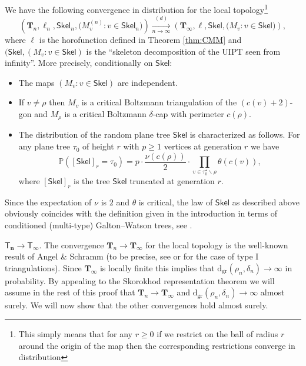\documentclass[AHL,XML,longabstracts,Unicode,NoSaveZebib]{cedram}
\begin{document}
\begin{theorem} \label{thm:skeletoninfinity} We have the following convergence in distribution for the local topology\footnote{This simply means that for any $r\geq 0$ if we restrict on the ball of radius $r$ around the origin of the map then the corresponding restrictions converge in distribution}
$$ \left( \mathbf{T}_{n}, \ell_{n}, \mathsf{Skel}_{n} , \big( M_{v}^{(n)} : v \in \mathsf{Skel}_{n} \big)\right) \xrightarrow[n\to\infty]{(d)} \left( \mathbf{T}_{\infty}, \ell, \mathsf{Skel}, \big( M_{v} : v \in \mathsf{Skel} \big)\right),$$
where $\ell$ is the horofunction defined in Theorem \ref{thm:CMM} and $(\mathsf{Skel}, ( M_{v} : v \in \mathsf{Skel} )$ is the ``skeleton decomposition of the UIPT seen from infinity''. More precisely, conditionally on $ \mathsf{Skel}$:
\begin{itemize}
\item The maps $(M_{v} : v \in \mathsf{Skel})$ are independent.
\item If $v \ne \rho$ then $M_{v}$ is a critical Boltzmann triangulation of the $(c(v)+2)$-gon and $M_{\rho}$ is a critical Boltzmann $\delta$-cap with perimeter $c(\rho)$.
\item The distribution of the random plane tree $ \mathsf{Skel}$ is characterized as follows. For any plane tree $\tau_{0}$ of height $r$ with $p \geq 1$ vertices at generation $r$ we have
$$ \mathbb{P}([ \mathsf{Skel}]_{r} = \tau_{0}) = p \cdot \frac{\nu( c(\rho))}{2} \cdot \prod_{v \in \tau_{0}^{\star}\backslash \rho} \theta( c(v)),$$
where $[ \mathsf{Skel}]_{r}$ is the tree $ \mathsf{Skel}$ truncated at generation $r$.
\end{itemize}
\end{theorem}
\begin{remark}
Since the expectation of $\nu$ is $2$ and $\theta$ is critical, the law of $ \mathsf{Skel}$ as described above obviously coincides with the definition given in the introduction in terms of conditioned (multi-type) Galton--Watson trees, see \cite{ADG}.\end{remark}
\proof  $ \boldsymbol{\mathsf{T}_{n} \to \mathsf{T}_{\infty}}$. The convergence $ \mathbf{T}_{n} \to \mathbf{T}_{\infty}$ for the local topology is the well-known result of Angel \& Schramm (to be precise, see \cite{Ste14} or \cite{CLGfpp} for the case of type I triangulations). Since $ \mathbf{T}_{\infty}$ is locally finite this implies that $ \mathrm{d_{gr}}(\rho_{n}, \delta_{n}) \to \infty$ in probability. By appealing to the Skorokhod representation theorem we will assume in the rest of this proof that $ \mathbf{T}_{n} \to \mathbf{T}_{\infty}$ and $ \mathrm{d_{gr}}( \rho_{n}, \delta_{n}) \to \infty$ almost surely. We will now show that the other convergences hold almost surely.
\end{document}

